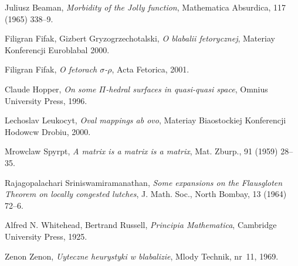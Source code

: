 \documentclass{my_pracamgr}
\begin{document}
\begin{thebibliography}{99}

 Juliusz Beaman, \textit{Morbidity of the Jolly
    function}, Mathematica Absurdica, 117 (1965) 338--9.

 Filigran Fifak, Gizbert Gryzogrzechotalski,
  \textit{O blabalii fetorycznej}, Materiay Konferencji Euroblabal
  2000.

 Filigran Fifak, \textit{O fetorach
    $\sigma$-$\rho$}, Acta Fetorica, 2001.

 Claude Hopper, \textit{On some $\Pi$-hedral
    surfaces in quasi-quasi space}, Omnius University Press, 1996.

 Lechoslav Leukocyt, \textit{Oval mappings ab ovo},
  Materiay Biaostockiej Konferencji Hodowcw Drobiu, 2000.

 Mrowclaw Spyrpt, \textit{A matrix is a matrix
    is a matrix}, Mat. Zburp., 91 (1959) 28--35.

 Rajagopalachari Sriniswamiramanathan,
  \textit{Some expansions on the Flausgloten Theorem on locally
    congested lutches}, J. Math.  Soc., North Bombay, 13 (1964) 72--6.

 Alfred N. Whitehead, Bertrand Russell,
  \textit{Principia Mathematica}, Cambridge University Press, 1925.

 Zenon Zenon, \textit{Uyteczne heurystyki
    w blabalizie}, Mlody Technik, nr~11, 1969.

\end{thebibliography}
\end{document}
